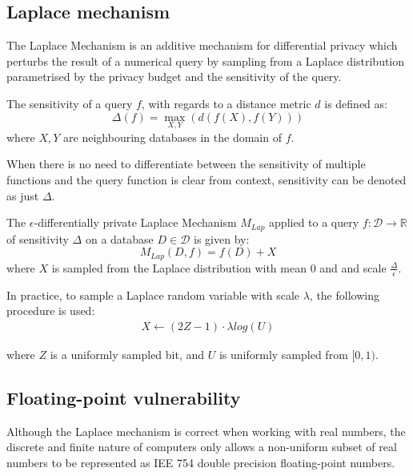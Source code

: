 \documentclass[orivec,envcountsame]{llncs}
\begin{document}
\subsection{Laplace mechanism}

The Laplace Mechanism is an additive mechanism for differential privacy which perturbs the result of a numerical query by sampling from a Laplace distribution parametrised by the privacy budget and the sensitivity of the query.

\begin{definition}
The sensitivity of a query $f$, with regards to a distance metric $d$ is defined as:
\large $$\Delta(f) = \max_{X,Y}(d(f(X), f(Y)))$$
\normalsize where $X, Y$ are neighbouring databases in the domain of $f$.
\end{definition}

When there is no need to differentiate between the sensitivity of multiple functions and the query function is clear from context, sensitivity can be denoted as just $\Delta$.

\begin{definition}
The $\epsilon$-differentially private Laplace Mechanism $M_{Lap}$ applied to a query $f: \mathcal{D} \rightarrow \mathbb{R}$ of sensitivity $\Delta$ on a database $D \in \mathcal{D}$ is given by:
\large $$ M_{Lap}(D, f) = f(D) + X $$
\normalsize where $X$ is sampled from the Laplace distribution with mean 0 and and scale $\frac{\Delta}{\epsilon}$.

\end{definition}

In practice, to sample a Laplace random variable with scale $\lambda$, the following procedure is used:
\begin{eqnarray}
X \leftarrow (2Z - 1) \cdot \lambda log(U) \label{eq:lap}
\end{eqnarray}

where $Z$ is a uniformly sampled bit, and $U$ is uniformly sampled from $[0, 1)$.

\subsection{Floating-point vulnerability}
Although the Laplace mechanism is correct when working with real numbers, the discrete and finite nature of computers only allows a non-uniform subset of real numbers to be represented as IEE 754 double precision floating-point numbers. 
\end{document}
